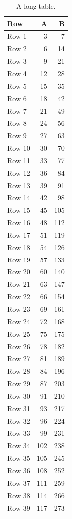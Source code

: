 \documentclass{article}
\begin{document}
\begin{longtable}{lrr}
\caption{A long table.}\\
\toprule Row & A & B \\\midrule\endhead
  Row 1 & 3 & 7 \\
  Row 2 & 6 & 14 \\
  Row 3 & 9 & 21 \\
  Row 4 & 12 & 28 \\
  Row 5 & 15 & 35 \\
  Row 6 & 18 & 42 \\
  Row 7 & 21 & 49 \\
  Row 8 & 24 & 56 \\
  Row 9 & 27 & 63 \\
  Row 10 & 30 & 70 \\
  Row 11 & 33 & 77 \\
  Row 12 & 36 & 84 \\
  Row 13 & 39 & 91 \\
  Row 14 & 42 & 98 \\
  Row 15 & 45 & 105 \\
  Row 16 & 48 & 112 \\
  Row 17 & 51 & 119 \\
  Row 18 & 54 & 126 \\
  Row 19 & 57 & 133 \\
  Row 20 & 60 & 140 \\
  Row 21 & 63 & 147 \\
  Row 22 & 66 & 154 \\
  Row 23 & 69 & 161 \\
  Row 24 & 72 & 168 \\
  Row 25 & 75 & 175 \\
  Row 26 & 78 & 182 \\
  Row 27 & 81 & 189 \\
  Row 28 & 84 & 196 \\
  Row 29 & 87 & 203 \\
  Row 30 & 91 & 210 \\
  Row 31 & 93 & 217 \\
  Row 32 & 96 & 224 \\
  Row 33 & 99 & 231 \\
  Row 34 & 102 & 238 \\
  Row 35 & 105 & 245 \\
  Row 36 & 108 & 252 \\
  Row 37 & 111 & 259 \\
  Row 38 & 114 & 266 \\
  Row 39 & 117 & 273 \\

\end{longtable}
\end{document}
